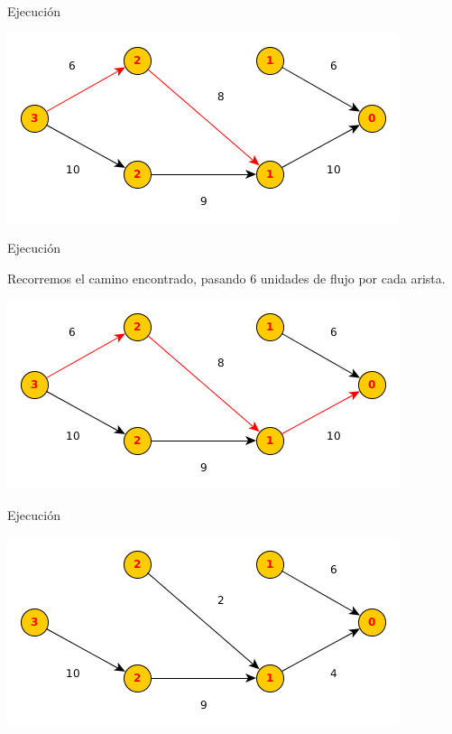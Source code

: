 \documentclass{beamer}
\begin{document}
\begin{frame}{Ejecución}

    
    \includegraphics[scale=0.6]{dinitz/dinitz8.png}
    
\end{frame}

\begin{frame}{Ejecución}

    Recorremos el camino encontrado, pasando 6 unidades de flujo por cada arista.
    
    \includegraphics[scale=0.6]{dinitz/dinitz9.png}
    
\end{frame}

\begin{frame}{Ejecución}

    
    \includegraphics[scale=0.6]{dinitz/dinitz10.png}
    
\end{frame}
\end{document}
